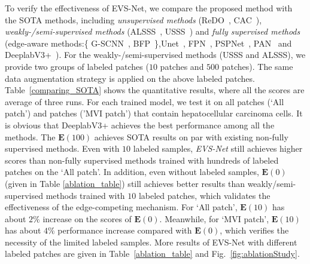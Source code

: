 \documentclass[letterpaper]{article} %
\begin{document}
To verify the effectiveness of EVS-Net, we compare the proposed method with the SOTA methods, including \emph{unsupervised methods} (ReDO~\cite{chen2019unsupervised}, CAC~\cite{hsu2018co-attention}),
\emph{weakly-/semi-supervised methods} (ALSSS~\cite{hung2018adversarial}, USSS~\cite{kalluri2019universal}) and
\emph{fully supervised methods } (edge-aware methods:\{ G-SCNN~\cite{takikawa2019gated-scnn:}, BFP~\cite{ding2019boundary-aware}\},Unet~\cite{ronneberger2015u-net:}, FPN~\cite{lin2017feature}, PSPNet~\cite{zhao2017pyramid}, PAN~\cite{li2018pyramid} and DeeplabV3+~\cite{chen2017rethinking}).
For the weakly-/semi-supervised methods (USSS and ALSSS), we provide two groups of labeled patches ($10$ patches and $500$ patches).
The same data augmentation strategy is applied on the above labeled patches.
Table~\ref{comparing_SOTA} shows the quantitative results, where all the scores are average of three runs.
For each trained model, we test it on all patches (`All patch') and patches ('MVI patch') that contain hepatocellular carcinoma cells.
It is obvious that DeeplabV3+ achieves the best performance among all the methods.
The $\mathbf{E}(100)$ achieves SOTA results on par with existing non-fully supervised methods.
Even with $10$ labeled samples,  \emph{EVS-Net} still achieves higher scores than non-fully supervised methods trained with hundreds of labeled patches on the `All patch'.
In addition, even without labeled samples,  $\mathbf{E}(0)$ (given in Table \ref{ablation_table}) still achieves better results than weakly/semi-supervised methods trained with $10$ labeled patches, which validates the effectiveness of the edge-competing mechanism.
 For `All patch', $\mathbf{E}(10)$ has about $2\%$ increase on the scores of $\mathbf{E}(0)$.
Meanwhile, for `MVI patch', $\mathbf{E}(10)$ has about $4\%$ performance increase compared with $\mathbf{E}(0)$,
which verifies the necessity of the limited labeled samples. More results of EVS-Net with different labeled patches are given in Table~\ref{ablation_table} and Fig.~\ref{fig:ablationStudy}.
\end{document}
